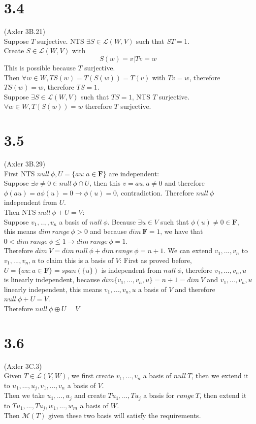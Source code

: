 \documentclass{article}
\begin{document}
\section{3.4}
(Axler 3B.21)\\
Suppose $T$ surjective. NTS $\exists S \in \mathcal{L}(W, V)$ such that $ST = 1$.\\
Create $S \in \mathcal{L}(W, V)$ with
\begin{equation*}
    S(w) = v | Tv = w
\end{equation*}
This is possible because $T$ surjective.\\
Then $\forall w \in W, TS(w) = T(S(w)) = T(v)$ with $Tv = w$, therefore $TS(w) = w$, therefore $TS = 1$.\\
Suppose $\exists S \in \mathcal{L}(W, V)$ such that $TS = 1$, NTS $T$ surjective.\\
$\forall w \in W, T(S(w)) = w$ therefore $T$ surjective.
\section{3.5}
(Axler 3B.29)\\
First NTS $null\ \phi, U = \{au:a \in \mathbf{F}\}$ are independent:\\
Suppose $\exists v \neq 0 \in null\ \phi \cap U$, then this $v = au, a \neq 0$ and therefore $\phi(au) = a \phi(u) = 0 \rightarrow \phi(u) = 0$, contradiction. Therefore $null\ \phi$ independent from $U$.\\
Then NTS $null\ \phi + U = V$:\\
Suppose $v_1, ..,, v_n$ a basis of $null\ \phi$. Because $\exists u \in V$ such that $\phi(u) \neq 0 \in \mathbf{F}$, this means $dim\ range\ \phi > 0$ and because $dim\ \mathbf{F} = 1$, we have that $0 < dim\ range\ \phi \leq 1 \rightarrow dim\ range\ \phi = 1$.\\
Therefore $dim\ V = dim\ null\ \phi + dim\ range\ \phi = n+1$. We can extend $v_1, ..., v_n$ to $v_1, ..., v_n, u$ to claim this is a basis of $V$:
First as proved before, $U = \{au: a \in \mathbf{F}\} = span(\{u\})$ is independent from $null\ \phi$, therefore $v_1, ..., v_n, u$ is linearly independent, because $dim \{v_1, ..., v_n, u\} = n+1 = dim\ V$ and $v_1, ..., v_n, u$ linearly independent, this means $v_1, ..., v_n, u$ a basis of $V$ and therefore $null\ \phi + U = V$.\\
Therefore $null\ \phi \oplus U = V$
\section{3.6}
(Axler 3C.3)\\
Given $T \in \mathcal{L}(V, W)$, we first create $v_1, ..., v_n$ a basis of $null\ T$, then we extend it to $u_1, ..., u_j, v_1, ..., v_n$ a basis of $V$.\\
Then we take $u_1, ..., u_j$ and create $Tu_1, ..., Tu_j$ a basis for $range\ T$, then extend it to $Tu_1, ..., Tu_j, w_1, ..., w_m$ a basis of $W$.\\
Then $\mathcal{M}(T)$ given these two basis will satisfy the requirements.
\end{document}

